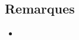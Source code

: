 \documentclass[a4paper, 11pt, hidelinks]{article}
\begin{document}
\subsection{Remarques}



\begin{itemize}
    \item 
\end{itemize}


































\end{document}

